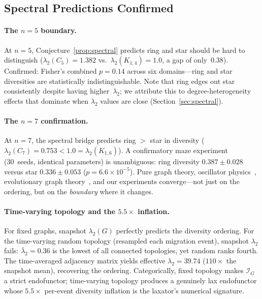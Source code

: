 \documentclass[submission,copyright,creativecommons]{eptcs}
\begin{document}
\subsection{Spectral Predictions Confirmed}
\label{sec:spectral-confirm}

\paragraph{The $n{=}5$ boundary.}
At $n{=}5$, Conjecture~\ref{prop:spectral} predicts ring and star
should be hard to distinguish ($\lambda_2(C_5) = 1.382$ vs.\
$\lambda_2(K_{1,4}) = 1.0$, a gap of only~$0.38$). Confirmed:
Fisher's combined $p = 0.14$ across six domains---ring and star
diversities are statistically indistinguishable.
Note that ring edges out star consistently despite having
higher~$\lambda_2$; we attribute this to degree-heterogeneity
effects that dominate when $\lambda_2$ values are close
(Section~\ref{sec:spectral}).

\paragraph{The $n{=}7$ confirmation.}
At $n{=}7$, the spectral bridge predicts ring $>$ star in diversity
($\lambda_2(C_7) = 0.753 < 1.0 = \lambda_2(K_{1,6})$). A
confirmatory maze experiment (30~seeds, identical parameters) is
unambiguous: ring diversity $0.387 \pm 0.028$ versus star
$0.336 \pm 0.053$ ($p = 6.6 \times 10^{-5}$). Pure graph theory,
oscillator physics~\cite{sanz2026algebraic}, evolutionary graph
theory~\cite{brewster2025diversity}, and our experiments
converge---not just on the ordering, but on the \emph{boundary}
where it changes.

\paragraph{Time-varying topology and the $5.5\times$ inflation.}
For fixed graphs, snapshot $\lambda_2(G)$ perfectly predicts the
diversity ordering. For the time-varying random topology (resampled
each migration event), snapshot $\lambda_2$ fails:
$\bar{\lambda}_2 = 0.36$ is the lowest of all connected topologies,
yet random ranks fourth. The time-averaged adjacency matrix yields
effective $\lambda_2 = 39.74$ ($110\times$ the snapshot mean),
recovering the ordering. Categorically, fixed topology makes
$\mathcal{I}_G$ a strict endofunctor; time-varying topology produces
a genuinely lax endofunctor whose $5.5\times$ per-event diversity
inflation is the laxator's numerical signature.
\end{document}
